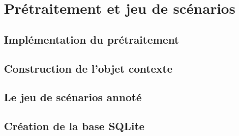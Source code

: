 
\section{Prétraitement et jeu de scénarios}


\subsection{Implémentation du prétraitement}

\subsection{Construction de l'objet contexte}

\subsection{Le jeu de scénarios annoté}

\subsection{Création de la base SQLite}
